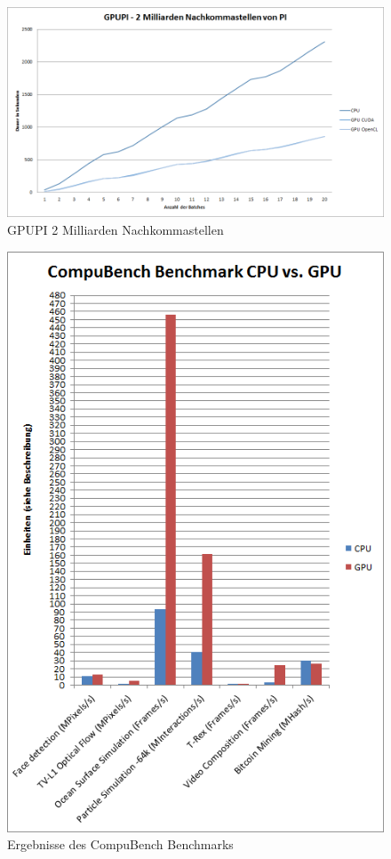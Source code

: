 \begin{figure}[!h]
	\begin{center}
		\includegraphics[width=1.0\linewidth]{images/GPUPI_2B.png}
		\caption{GPUPI 2 Milliarden Nachkommastellen}
		\label{GPUPI_2B}
	\end{center}
\end{figure}

\begin{figure}[!h]
	\begin{center}
		\includegraphics[width=0.8\linewidth]{images/CompuBench.png}
		\caption{Ergebnisse des CompuBench Benchmarks}
		\label{CompuBench}
	\end{center}
\end{figure}
\pagebreak
